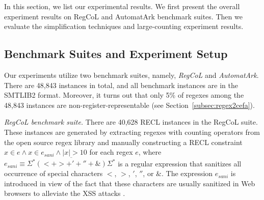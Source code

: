 %
In this section, we list our experimental results. We first present the overall experiment results on RegCoL and AutomatArk benchmark suites. Then we evaluate the simplification techniques and large-counting experiment results.


\vspace{-2mm}
\subsection{Benchmark Suites and Experiment Setup}\label{sec:bench}
\vspace{-1mm}

Our experiments utilize two benchmark suites, namely, \emph{RegCoL} and \emph{AutomatArk}. There are 48,843 instances in total, and all benchmark instances are in the SMTLIB2 format.
Moreover, it turns out that only 5\% of regexes among the 48,843 instances are non-register-representable (see Section~\ref{subsec:regex2cefa}).

\medskip
\noindent
\emph{RegCoL benchmark suite.} There are 40,628 RECL instances in the RegCoL suite. These instances are generated by extracting regexes with counting operators from the open source regex library \cite{regex_lingua_franca,redos_lenka} and manually constructing a RECL constraint $x \in e \wedge x \in e_{sani} \wedge |x| > 10$ for each regex $e$,
where $e_{sani} \equiv \overline{\Sigma^*(<+ >+'+''+\&)\Sigma^*}$ is a regular expression that sanitizes all occurrence of special characters $<$, $>$, $'$, $''$, or $\&$. 
The expression $e_{sani}$ is introduced in view of the fact that these characters are usually sanitized in Web browsers to alleviate the XSS attacks \cite{malware_detection_3_kudzu,CCH_18}.
\vspace{-0.1mm}

